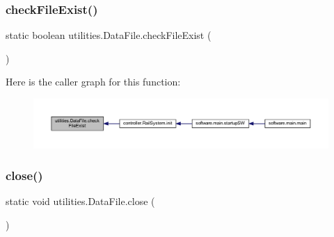 \subsubsection{\texorpdfstring{check\+File\+Exist()}{checkFileExist()}}
{\footnotesize\ttfamily static boolean utilities.\+Data\+File.\+check\+File\+Exist (\begin{DoxyParamCaption}{ }\end{DoxyParamCaption})\hspace{0.3cm}{\ttfamily [static]}}

Here is the caller graph for this function\+:\nopagebreak
\begin{figure}[H]
\begin{center}
\leavevmode
\includegraphics[width=350pt]{classutilities_1_1_data_file_a28beb850c6cc447aa7757e9f3967224c_icgraph}
\end{center}
\end{figure}
\mbox{\label{classutilities_1_1_data_file_a4f113f0a5f50902308585d1f11988ec7}} 
\subsubsection{\texorpdfstring{close()}{close()}}
{\footnotesize\ttfamily static void utilities.\+Data\+File.\+close (\begin{DoxyParamCaption}{ }\end{DoxyParamCaption})\hspace{0.3cm}{\ttfamily [static]}}


